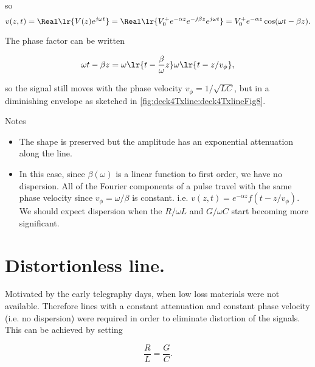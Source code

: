 so 
\begin{dmath}\label{eqn:uwaves4TransmissionLines:720}
v(z, t) 
= \Real \lr{ V(z) e^{j \omega t} }
= \Real \lr{ V_0^{+} e^{-\alpha z} e^{-j \beta z} e^{j \omega t} }
= V_0^{+} e^{-\alpha z} \cos( \omega t - \beta z ).
\end{dmath}

The phase factor can be written

\begin{dmath}\label{eqn:uwaves4TransmissionLines:740}
\omega t - \beta z 
= 
\omega \lr{ t - \frac{\beta}{\omega} z }
\omega \lr{ t - z/v_\phi },
\end{dmath}

so the signal still moves with the phase velocity \( v_\phi = 1/\sqrt{LC} \), but in a diminishing envelope as sketched in \cref{fig:deck4Txline:deck4TxlineFig8}.


Notes

\begin{itemize}
\item The shape is preserved but the amplitude has an exponential attenuation along the line.
\item In this case, since \( \beta(\omega) \) is a linear function to first order, we have no dispersion.  All of the Fourier components of a pulse travel with the same phase velocity since \( v_\phi = \omega/\beta \) is constant.  i.e.  \( v(z, t) = e^{-\alpha z} f( t - z/v_\phi ) \).  We should expect dispersion when the \( R/\omega L \) and \( G/\omega C \) start becoming more significant.
\end{itemize}

\section{Distortionless line.}

Motivated by the early telegraphy days, when low loss materials were not available.  Therefore lines with a constant attenuation and constant phase velocity (i.e. no dispersion) were required in order to eliminate distortion of the signals.  This can be achieved by setting 

\begin{equation}\label{eqn:uwaves4TransmissionLines:760}
\frac{R}{L} = \frac{G}{C}.
\end{equation}

